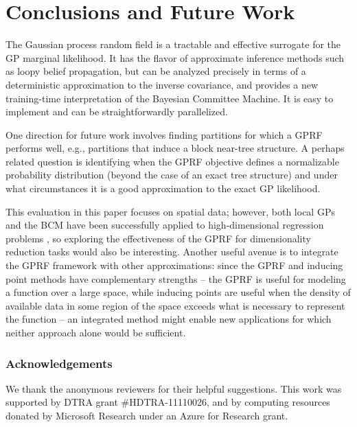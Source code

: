 \documentclass{article}
\begin{document}
\section{Conclusions and Future Work}
\vspace{-0.4cm}
The Gaussian process random field is a tractable and effective
surrogate for the GP marginal likelihood. It has the flavor of
approximate inference methods such as loopy belief propagation, but
can be analyzed precisely in terms of a deterministic approximation to
the inverse covariance, and provides a new training-time
interpretation of the Bayesian Committee Machine. It is easy to
implement and can be straightforwardly parallelized. 

One direction for future work involves finding partitions for
which a GPRF performs well, e.g., partitions that induce a block near-tree
structure. A perhaps related question is identifying when the GPRF
objective defines a normalizable probability
distribution (beyond the case of an exact tree structure) and under
what circumstances it is a good approximation to the exact GP likelihood.

This evaluation in this paper focuses on spatial data; however, both local
GPs and the BCM have been successfully applied to high-dimensional
regression problems \cite{chalupka2012, deisenroth2015distributed}, so
exploring the effectiveness of the GPRF for dimensionality reduction
tasks would also be interesting. Another useful avenue is to integrate the
GPRF framework with other approximations: since the GPRF and inducing
point methods have complementary strengths -- the GPRF is useful for
modeling a function over a large space, while inducing points are useful
when the density of available data in some region of the space
exceeds what is necessary to represent the function -- an integrated
method might enable new applications for which neither approach alone
would be sufficient. 
\vspace{-0.4cm}
\subsubsection*{Acknowledgements}
\vspace{-0.2cm}
We thank the anonymous reviewers for their helpful 
suggestions.  This work was supported by DTRA grant \#HDTRA-11110026,
and by computing resources donated by Microsoft Research under an Azure for Research grant.
 

{\small }
\end{document}
